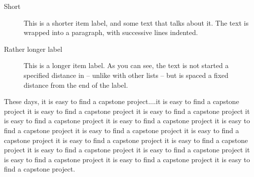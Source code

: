 \documentclass[11pt]{article}
\theoremstyle{plain}
\theoremstyle{definition}
\begin{document}
\begin{description}
    \item[Short] This is a shorter item label, and some text that talks
        about it. The text is wrapped into a paragraph, with successive
        lines indented.
    \item[Rather longer label] This is a longer item label.  As you can
        see, the text is not started a specified distance in -- unlike
        with other lists -- but is spaced a fixed distance from the end
        of the label.
\end{description}

These days, it is easy to find a capstone project....it is easy to find a capstone project it is easy to find a capstone project it is easy to find a capstone project it is easy to find a capstone project it is easy to find a capstone project it is easy to find a capstone project it is easy to find a capstone project it is easy to find a capstone project it is easy to find a capstone project it is easy to find a capstone project it is easy to find a capstone project it is easy to find a capstone project it is easy to find a capstone project it is easy to find a capstone project it is easy to find a capstone project.
\end{document}
